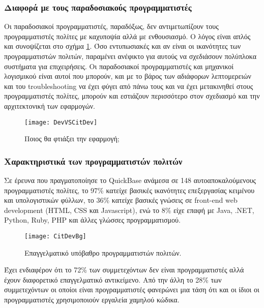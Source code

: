                 \subsubsection{Διαφορά με τους παραδοσιακούς προγραμματιστές}
                    Οι παραδοσιακοί προγραμματιστές, παραδόξως, δεν αντιμετωπίζουν τους προγραμματιστές πολίτες με καχυποψία αλλά με ενθουσιασμό. Ο λόγος είναι απλός και συνοψίζεται στο σχήμα \ref{fig:DevVSCitDev}. Όσο εντυπωσιακές και αν είναι οι ικανότητες των προγραμματιστών πολιτών, παραμένει ανέφικτο για αυτούς να σχεδιάσουν πολύπλοκα συστήματα για επιχειρήσεις. Οι παραδοσιακοί προγραμματιστές και μηχανικοί λογισμικού είναι αυτοί που μπορούν, και με το βάρος των αδιάφορων λεπτομερειών και του troubleshooting να έχει φύγει από πάνω τους και να έχει μετακινηθεί στους προγραμματιστές πολίτες, μπορούν και εστιάζουν περισσότερο στον σχεδιασμό και την αρχιτεκτονική των εφαρμογών.

                    \begin{figure}[h!] \noindent \centering
                            \texttt{[image: DevVSCitDev]}
                            \caption{Ποιος θα φτιάξει την εφαρμογή; \cite{LowCodeSimon}}
                            \label{fig:DevVSCitDev}
                    \end{figure}

                \subsubsection{Χαρακτηριστικά των προγραμματιστών πολιτών}
                    Σε έρευνα \cite{QuickBaseCitizenDevReport} που πραγματοποίησε το QuickBase ανάμεσα σε 148 αυτοαποκαλούμενους προγραμματιστές πολίτες, το 97\% κατείχε βασικές ικανότητες επεξεργασίας κειμένου και υπολογιστικών φύλλων, το 36\% κατείχε βασικές γνώσεις σε front-end web development (HTML, CSS και Javascript), ενώ το 8\% είχε επαφή με Java, .NET, Python, Ruby, PHP και άλλες γλώσσες προγραμματισμού.

                    \begin{figure}[H] \noindent \centering
                            \texttt{[image: CitDevBg]}
                            \caption{Επαγγελματικό υπόβαθρο προγραμματιστών πολιτών. \cite{LowCodeSimon}}
                    \end{figure}

                    \vspace{-2.5em}
                    \begin{displayquote}
                        \small Έχει ενδιαφέρον ότι το 72\% των συμμετεχόντων δεν είναι προγραμματιστές αλλά έχουν διαφορετικό επαγγελματικό αντικείμενο. Από την άλλη το 28\% των συμμετεχόντων οι οποίοι είναι προγραμματιστές φανερώνει μια τάση ότι και οι ίδιοι οι προγραμματιστές χρησιμοποιούν εργαλεία χαμηλού κώδικα.
                    \end{displayquote}

